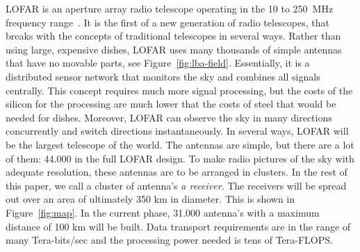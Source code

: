 \documentclass{article}
\begin{document}
LOFAR is an aperture array radio telescope operating in the
10 to 250~MHz frequency range~\cite{deVos:09}.  It is the first of a new generation of
radio telescopes, that breaks with the concepts of traditional
telescopes in several ways.  Rather than using large, expensive
dishes, LOFAR uses many thousands of simple antennas that have no
movable parts, see
Figure~\ref{fig:lba-field}.  Essentially, it is a distributed sensor
network that monitors the sky and combines all signals centrally.
This concept requires much more signal processing, but the 
costs of the silicon for the processing are much lower that the costs of steel that would
be needed for dishes. Moreover, LOFAR can observe the sky in many
directions concurrently and switch directions instantaneously.  In
several ways, LOFAR will be the largest telescope of the world.
The antennas are simple, but there are a lot of them: 44.000 in the full LOFAR
design. To make radio pictures of the sky with adequate resolution,
these antennas are to be arranged in clusters.
In the rest of this paper, we call a cluster of antenna's \emph{a receiver}.
The receivers will be spread out over
an area of ultimately 350 km in diameter. This is shown in Figure~\ref{fig:map}.
In the current phase, 31.000 antenna's with a maximum distance of 100 km will
be built. Data transport requirements are in the range of many
Tera-bits/sec and the processing power needed is tens of Tera-FLOPS.
\end{document}
